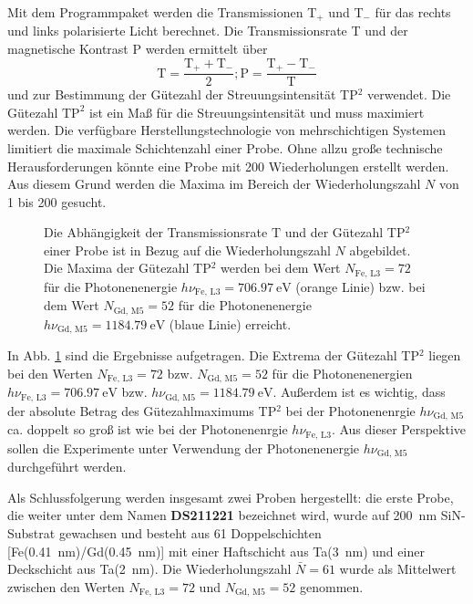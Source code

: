\noindent
Mit dem Programmpaket werden die Transmissionen T$_+$ und T$_-$ für das rechts und links polarisierte Licht berechnet. Die Transmissionsrate T und der magnetische Kontrast P werden ermittelt über
\begin{equation}
    \text{T} = \frac{\text{T}_+ + \text{T}_-}{2}; \text{P} = \frac{\text{T}_+ - \text{T}_-}{\text{T}}
\end{equation}
und zur Bestimmung der Gütezahl der Streuungsintensität TP$^2$ verwendet. Die Gütezahl $\text{TP}^2$ ist ein Maß für die Streuungsintensität und muss maximiert werden. Die verfügbare Herstellungstechnologie von mehrschichtigen Systemen limitiert die maximale Schichtenzahl einer Probe. Ohne allzu große technische Herausforderungen könnte eine Probe mit 200 Wiederholungen erstellt werden. Aus diesem Grund werden die Maxima im Bereich der Wiederholungszahl $N$ von 1 bis 200 gesucht.
\begin{figure}[H]
    \centering
    
    \caption{Die Abhängigkeit der Transmissionsrate $\text{T}$ und der Gütezahl TP$^2$ einer Probe ist in Bezug auf die Wiederholungszahl $N$ abgebildet. Die Maxima der Gütezahl TP$^2$ werden bei dem Wert $N_{\text{Fe, L3}}=72$ für die Photonenenergie $h\nu_{\text{Fe, L3}}=\SI{706,97}{\eV}$ (orange Linie) bzw. bei dem Wert $N_{\text{Gd, M5}}=52$ für die Photonenenergie $h\nu_{\text{Gd, M5}}=\SI{1184,79}{\eV}$ (blaue Linie) erreicht.}
    \label{fig:proben_vergleich_centered}
\end{figure}
\noindent
In Abb. \ref{fig:proben_vergleich_centered} sind die Ergebnisse aufgetragen. Die Extrema der Gütezahl TP$^2$ liegen bei den Werten $N_{\text{Fe, L3}}=72$  bzw. $N_{\text{Gd, M5}}=52$ für die Photonenenergien $h\nu_{\text{Fe, L3}}=\SI{706,97}{\eV}$ bzw. $h\nu_{\text{Gd, M5}}=\SI{1184,79}{\eV}$. Außerdem ist es wichtig, dass der absolute Betrag des Gütezahlmaximums TP$^2$ bei der Photonenenrgie $h\nu_{\text{Gd, M5}}$ ca. doppelt so groß ist wie bei der Photonenenrgie $h\nu_{\text{Fe, L3}}$. Aus dieser Perspektive sollen die Experimente unter Verwendung der Photonenenergie $h\nu_{\text{Gd, M5}}$ durchgeführt werden.

\noindent
Als Schlussfolgerung werden insgesamt zwei Proben hergestellt: die erste Probe, die weiter unter dem Namen \textbf{DS211221} bezeichnet wird, wurde auf \SI{200}{\nano\meter} SiN-Substrat gewachsen und besteht aus 61 Doppelschichten [Fe(\SI{0.41}{\nano\meter})/Gd(\SI{0.45}{\nano\meter})] mit einer Haftschicht aus Ta(\SI{3}{\nano\meter}) und einer Deckschicht aus Ta(\SI{2}{\nano\meter}). Die Wiederholungszahl $\bar{N} = 61$ wurde als Mittelwert zwischen den Werten $N_{\text{Fe, L3}}=72$ und $N_{\text{Gd, M5}}=52$ genommen.

